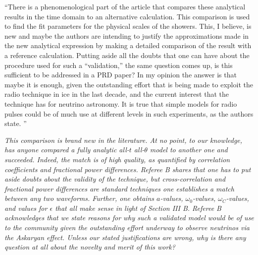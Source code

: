 \documentclass[12pt]{article}
\begin{document}
``There is a phenomenological part of the article that compares these analytical results in the time domain to an alternative calculation. This comparison is used to find the fit parameters for the physical scales of the showers. This, I believe, is new and maybe the authors are intending to justify the approximations made in the new analytical expression by making a detailed comparison of the result with a reference calculation. Putting aside all the doubts that one can have about the procedure used for such a ``validation,'' the same question comes up, is this sufficient to be addressed in a PRD paper? In my opinion the answer is that maybe it is enough, given the outstanding effort that is being made to exploit the radio technique in ice in the last decade, and the current interest that the technique has for neutrino astronomy. It is true that simple models for radio pulses could be of much use at different levels in such experiments, as the authors state. ''

\textit{This comparison is brand new in the literature.  At no point, to our knowledge, has anyone compared a fully analytic all-$t$ all-$\theta$ model to another one and succeeded.  Indeed, the match is of high quality, as quantified by correlation coefficients and fractional power differences.  Referee B shares that one has to put aside doubts about the validity of the technique, but cross-correlation and fractional power differences are standard techniques one establishes a match between any two waveforms.  Further, one obtains $a$-values, $\omega_0$-values, $\omega_C$-values, and values for $\epsilon$ that all make sense in light of Section III B.  Referee B acknowledges that we state reasons for why such a validated model would be of use to the community given the outstanding effort underway to observe neutrinos via the Askaryan effect.  Unless our stated justifications are wrong, why is there any question at all about the novelty and merit of this work?}
\end{document}
